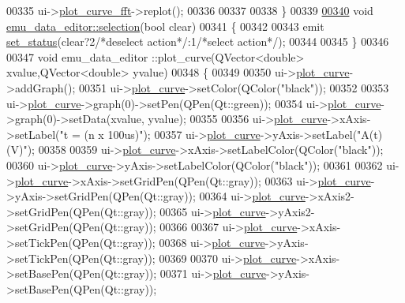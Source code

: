 \begin{DoxyCode}
00335      ui->\hyperlink{a00079_a2bdf46ca3b702151408e6f6bd96b3228}{plot\_curve\_fft}->replot();
00336 
00337 
00338 \}
00339 
\hypertarget{a00093_source_l00340}{}\hyperlink{a00008_a86f994dedec393af88b5d1a37b1e30b5}{00340} \textcolor{keywordtype}{void} \hyperlink{a00008_a86f994dedec393af88b5d1a37b1e30b5}{emu\_data\_editor::selection}(\textcolor{keywordtype}{bool} clear)
00341 \{
00342 
00343     emit \hyperlink{a00008_a9476424a86a6ed4f84c64d0ac77143cc}{set\_status}(clear?2\textcolor{comment}{/*deselect action*/}:1\textcolor{comment}{/*select action*/});
00344 
00345 \}
00346 
00347 \textcolor{keywordtype}{void} emu\_data\_editor ::plot\_curve(QVector<double> xvalue,QVector<double> yvalue)
00348 \{
00349 
00350   ui->\hyperlink{a00079_a1d46308dee8db7e3c99af65f13055479}{plot\_curve}->addGraph();
00351   ui->\hyperlink{a00079_a1d46308dee8db7e3c99af65f13055479}{plot\_curve}->setColor(QColor(\textcolor{stringliteral}{"black"}));
00352 
00353   ui->\hyperlink{a00079_a1d46308dee8db7e3c99af65f13055479}{plot\_curve}->graph(0)->setPen(QPen(Qt::green));
00354   ui->\hyperlink{a00079_a1d46308dee8db7e3c99af65f13055479}{plot\_curve}->graph(0)->setData(xvalue, yvalue);
00355 
00356   ui->\hyperlink{a00079_a1d46308dee8db7e3c99af65f13055479}{plot\_curve}->xAxis->setLabel(\textcolor{stringliteral}{"t = (n x 100us)"});
00357   ui->\hyperlink{a00079_a1d46308dee8db7e3c99af65f13055479}{plot\_curve}->yAxis->setLabel(\textcolor{stringliteral}{"A(t)(V)"});
00358 
00359   ui->\hyperlink{a00079_a1d46308dee8db7e3c99af65f13055479}{plot\_curve}->xAxis->setLabelColor(QColor(\textcolor{stringliteral}{"black"}));
00360   ui->\hyperlink{a00079_a1d46308dee8db7e3c99af65f13055479}{plot\_curve}->yAxis->setLabelColor(QColor(\textcolor{stringliteral}{"black"}));
00361 
00362   ui->\hyperlink{a00079_a1d46308dee8db7e3c99af65f13055479}{plot\_curve}->xAxis->setGridPen(QPen(Qt::gray));
00363   ui->\hyperlink{a00079_a1d46308dee8db7e3c99af65f13055479}{plot\_curve}->yAxis->setGridPen(QPen(Qt::gray));
00364   ui->\hyperlink{a00079_a1d46308dee8db7e3c99af65f13055479}{plot\_curve}->xAxis2->setGridPen(QPen(Qt::gray));
00365   ui->\hyperlink{a00079_a1d46308dee8db7e3c99af65f13055479}{plot\_curve}->yAxis2->setGridPen(QPen(Qt::gray));
00366 
00367   ui->\hyperlink{a00079_a1d46308dee8db7e3c99af65f13055479}{plot\_curve}->xAxis->setTickPen(QPen(Qt::gray));
00368   ui->\hyperlink{a00079_a1d46308dee8db7e3c99af65f13055479}{plot\_curve}->yAxis->setTickPen(QPen(Qt::gray));
00369 
00370   ui->\hyperlink{a00079_a1d46308dee8db7e3c99af65f13055479}{plot\_curve}->xAxis->setBasePen(QPen(Qt::gray));
00371   ui->\hyperlink{a00079_a1d46308dee8db7e3c99af65f13055479}{plot\_curve}->yAxis->setBasePen(QPen(Qt::gray));

\end{DoxyCode}
